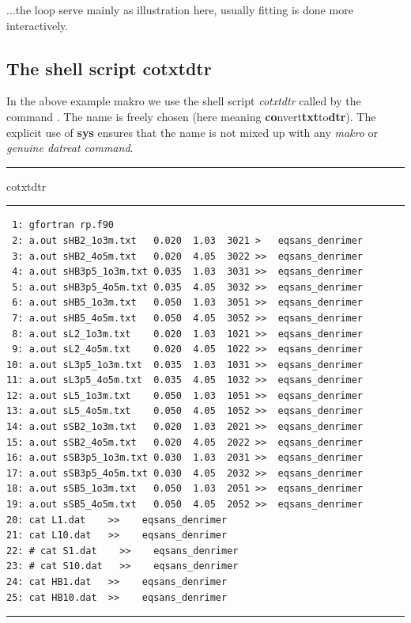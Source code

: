 \documentclass[11pt,fleqn]{book} %
\newcommand{\cmdl}[2]{{\color{red}{\bf \underline{#1} #2}}}
\begin{document}
...the loop serve mainly as illustration here, usually fitting is done more interactively.

\subsection{The shell script cotxtdtr}
\label{ssec:cotxtdtr}
In the above example makro we use the shell script \emph{cotxtdtr} called by the command
\cmdl{sys}{cotxtdtr}. The name is freely chosen (here meaning {\bf co}nvert{\bf txt}to{\bf dtr}).
The explicit use of {\bf sys} ensures that the name is not mixed up with any \emph{makro} 
or \emph{genuine datreat command}.

\rule{6cm}{1pt} cotxtdtr \rule{6cm}{1pt} 
%
\footnotesize
\begin{verbatim}
 1: gfortran rp.f90
 2: a.out sHB2_1o3m.txt   0.020  1.03  3021 >   eqsans_denrimer      
 3: a.out sHB2_4o5m.txt   0.020  4.05  3022 >>  eqsans_denrimer      
 4: a.out sHB3p5_1o3m.txt 0.035  1.03  3031 >>  eqsans_denrimer        
 5: a.out sHB3p5_4o5m.txt 0.035  4.05  3032 >>  eqsans_denrimer        
 6: a.out sHB5_1o3m.txt   0.050  1.03  3051 >>  eqsans_denrimer      
 7: a.out sHB5_4o5m.txt   0.050  4.05  3052 >>  eqsans_denrimer      
 8: a.out sL2_1o3m.txt    0.020  1.03  1021 >>  eqsans_denrimer     
 9: a.out sL2_4o5m.txt    0.020  4.05  1022 >>  eqsans_denrimer     
10: a.out sL3p5_1o3m.txt  0.035  1.03  1031 >>  eqsans_denrimer       
11: a.out sL3p5_4o5m.txt  0.035  4.05  1032 >>  eqsans_denrimer       
12: a.out sL5_1o3m.txt    0.050  1.03  1051 >>  eqsans_denrimer     
13: a.out sL5_4o5m.txt    0.050  4.05  1052 >>  eqsans_denrimer     
14: a.out sSB2_1o3m.txt   0.020  1.03  2021 >>  eqsans_denrimer      
15: a.out sSB2_4o5m.txt   0.020  4.05  2022 >>  eqsans_denrimer      
16: a.out sSB3p5_1o3m.txt 0.030  1.03  2031 >>  eqsans_denrimer        
17: a.out sSB3p5_4o5m.txt 0.030  4.05  2032 >>  eqsans_denrimer        
18: a.out sSB5_1o3m.txt   0.050  1.03  2051 >>  eqsans_denrimer      
19: a.out sSB5_4o5m.txt   0.050  4.05  2052 >>  eqsans_denrimer   
20: cat L1.dat    >>    eqsans_denrimer   
21: cat L10.dat   >>    eqsans_denrimer   
22: # cat S1.dat    >>    eqsans_denrimer   
23: # cat S10.dat   >>    eqsans_denrimer   
24: cat HB1.dat   >>    eqsans_denrimer   
25: cat HB10.dat  >>    eqsans_denrimer   
\end{verbatim}
\normalsize
%
\rule{12cm+}{1pt}
\end{document}
